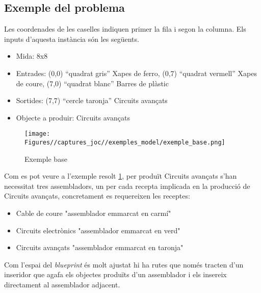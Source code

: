 \subsection{Exemple del problema}\label{subsec:blueprint_problem_example}
Les coordenades de les caselles indiquen primer la fila i segon la columna. Els inputs d'aquesta instància són les següents. \\
\begin{itemize}
    \item Mida: 8x8
    \item Entrades: (0,0) ``quadrat gris'' Xapes de ferro, (0,7) ``quadrat vermell'' Xapes de coure, (7,0) ``quadrat blanc'' Barres de plàstic
    \item Sortides: (7,7) ``cercle taronja'' Circuits avançats
    \item Objecte a produir: Circuits avançats
\end{itemize}

\begin{figure}
    \centering
    \texttt{[image: Figures//captures\_joc//exemples\_model/exemple\_base.png]}
    \caption{Exemple base}
    \label{fig:solucio_exemple}
\end{figure}

Com es pot veure a l'exemple resolt \ref{fig:solucio_exemple}, per produït Circuits avançats s'han necessitat tres assembladors, un per cada recepta implicada en la producció de Circuits avançats, concretament es requereixen les receptes:
\begin{itemize}
    \item Cable de coure "assemblador emmarcat en carmí"
    \item Circuits electrònics "assemblador emmarcat en verd"
    \item Circuits avançats "assemblador emmarcat en taronja"
\end{itemize}


Com l'espai del \textit{blueprint} és molt ajustat hi ha rutes que només tracten d'un inseridor que agafa els objectes produïts d'un assemblador i els insereix directament al assemblador adjacent.\\

